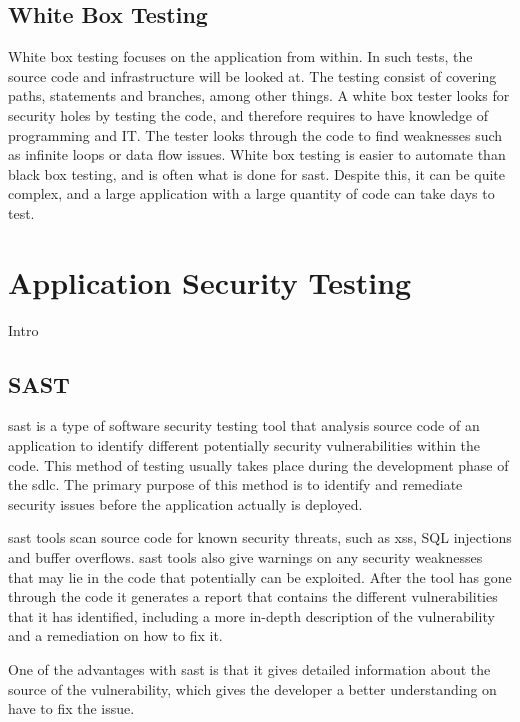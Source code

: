 \subsection{White Box Testing}
White box testing focuses on the application from within. In such tests, the source code and infrastructure will be looked at. The testing consist of covering paths, statements and branches, among other things. A white box tester looks for security holes by testing the code, and therefore requires to have knowledge of programming and IT. The tester looks through the code to find weaknesses such as infinite loops or data flow issues. White box testing is easier to automate than black box testing, and is often what is done for \acrlong{sast}. Despite this, it can be quite complex, and a large application with a large quantity of code can take days to test. \cite{whitebox}
\newpage

\section{Application Security Testing}
Intro

\subsection{SAST}
\acrlong{sast} is a type of software security testing tool that analysis source code of an application to identify different potentially security vulnerabilities within the code. This method of testing usually takes place during the development phase of the \acrlong{sdlc}. The primary purpose of this method is to identify and remediate security issues before the application actually is deployed. \cite{sast}

\acrshort{sast} tools scan source code for known security threats, such as \acrlong{xss}, SQL injections and buffer overflows. \acrshort{sast} tools also give warnings on any security weaknesses that may lie in the code that potentially can be exploited. After the tool has gone through the code it generates a report that contains the different vulnerabilities that it has identified, including a more in-depth description of the vulnerability and a remediation on how to fix it. 

One of the advantages with \acrshort{sast} is that it gives detailed information about the source of the vulnerability, which gives the developer a better understanding on have to fix the issue. 

